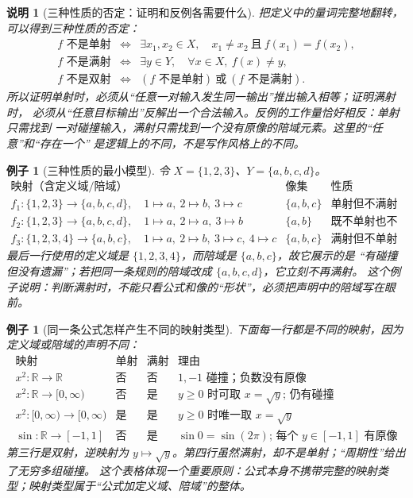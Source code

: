 \documentclass[UTF8,fontset=none,a4paper,11pt]{ctexart}
\theoremstyle{foundation-definition}
\theoremstyle{foundation-theorem}
\theoremstyle{foundation-proposition}
\theoremstyle{foundation-example}
\newtheorem{example}[definition]{例子}
\theoremstyle{foundation-remark}
\newtheorem{remark}[definition]{说明}
\theoremstyle{foundation-theorem}
\begin{document}
\begin{remark}[三种性质的否定：证明和反例各需要什么]
把定义中的量词完整地翻转，可以得到三种性质的否定：
\[
\begin{array}{rcl}
f\text{ 不是单射}
&\Longleftrightarrow&
\exists x_1,x_2\in X,\quad x_1\ne x_2\ \text{且}\ f(x_1)=f(x_2),\\[0.35em]
f\text{ 不是满射}
&\Longleftrightarrow&
\exists y\in Y,\quad\forall x\in X,\ f(x)\ne y,\\[0.35em]
f\text{ 不是双射}
&\Longleftrightarrow&
(f\text{ 不是单射})\ \text{或}\ (f\text{ 不是满射}).
\end{array}
\]
所以证明单射时，必须从“任意一对输入发生同一输出”推出输入相等；证明满射时，
必须从“任意目标输出”反解出一个合法输入。反例的工作量恰好相反：单射只需找到
一对碰撞输入，满射只需找到一个没有原像的陪域元素。这里的“任意”和“存在一个”
是逻辑上的不同，不是写作风格上的不同。
\end{remark}

\begin{example}[三种性质的最小模型]
令 \(X=\{1,2,3\}\)、\(Y=\{a,b,c,d\}\)。
\[
\begin{array}{c|c|c}
\text{映射（含定义域/陪域）}&\text{像集}&\text{性质}\\
\hline
f_1:\{1,2,3\}\to\{a,b,c,d\},\quad
1\mapsto a,\ 2\mapsto b,\ 3\mapsto c&\{a,b,c\}&\text{单射但不满射}\\
f_2:\{1,2,3\}\to\{a,b,c,d\},\quad
1\mapsto a,\ 2\mapsto a,\ 3\mapsto b&\{a,b\}&\text{既不单射也不满射}\\
f_3:\{1,2,3,4\}\to\{a,b,c\},\quad
1\mapsto a,\ 2\mapsto b,\ 3\mapsto c,\ 4\mapsto c&\{a,b,c\}&\text{满射但不单射}
\end{array}
\]
最后一行使用的定义域是 \(\{1,2,3,4\}\)，而陪域是 \(\{a,b,c\}\)，故它展示的是
“有碰撞但没有遗漏”；若把同一条规则的陪域改成 \(\{a,b,c,d\}\)，它立刻不再满射。
这个例子说明：判断满射时，不能只看公式和像的“形状”，必须把声明中的陪域写在眼前。
\end{example}

\begin{example}[同一条公式怎样产生不同的映射类型]
下面每一行都是不同的映射，因为定义域或陪域的声明不同：
\[
\begin{array}{c|c|c|c}
\text{映射}&\text{单射}&\text{满射}&\text{理由}\\
\hline
x^2:\mathbb R\to\mathbb R&\text{否}&\text{否}&1,-1\text{ 碰撞；负数没有原像}\\
x^2:\mathbb R\to[0,\infty)&\text{否}&\text{是}&y\ge0\text{ 时可取 }x=\sqrt y\text{; 仍有碰撞}\\
x^2:[0,\infty)\to[0,\infty)&\text{是}&\text{是}&y\ge0\text{ 时唯一取 }x=\sqrt y\\
\sin:\mathbb R\to[-1,1]&\text{否}&\text{是}&\sin 0=\sin(2\pi)\text{; 每个 }y\in[-1,1]\text{ 有原像}
\end{array}
\]
第三行是双射，逆映射为 \(y\mapsto\sqrt y\)。第四行虽然满射，却不是单射；“周期性”给出了无穷多组碰撞。
这个表格体现一个重要原则：\emph{公式本身不携带完整的映射类型；映射类型属于“公式加定义域、陪域”的整体。}
\end{example}
\end{document}
